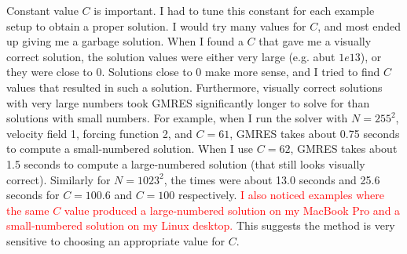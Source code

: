 \documentclass[11pt]{article}
\begin{document}
Constant value $C$ is important. I had to tune this constant for each example setup to obtain a 
proper solution. I would try many values for $C$, and most ended up giving me a garbage solution. 
When I found a $C$ that gave me a visually correct solution, the solution values were either very
large (e.g. abut $1e13$), or they were close to 0. Solutions close to 0 make more sense, and I
tried to find $C$ values that resulted in such a solution. Furthermore, visually
correct solutions with very large numbers took GMRES significantly longer to solve for than
solutions with small numbers. For example, when I run the solver with $N=255^2$, velocity 
field 1, forcing function 2, and $C=61$, GMRES takes about 0.75 seconds to compute a 
small-numbered solution. When I use $C=62$, GMRES takes about 1.5 seconds to compute a 
large-numbered solution (that still looks visually correct). Similarly for $N=1023^2$, the 
times were about 13.0 seconds and 25.6 seconds for $C=100.6$ and $C=100$ respectively. 
\textcolor{red}{I also noticed examples where the same $C$ value produced a large-numbered solution on my 
MacBook Pro and a small-numbered solution on my Linux desktop.} This suggests the method is very 
sensitive to choosing an appropriate value for $C$.






\end{document}
